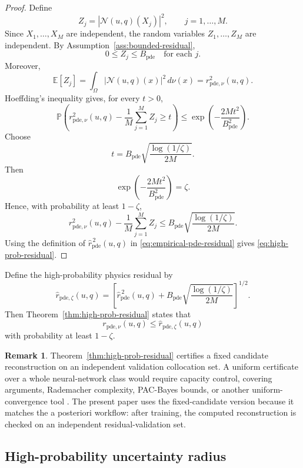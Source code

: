 \documentclass{article}
\numberwithin{equation}{section}
\theoremstyle{definition}
\newtheorem{remark}{Remark}
\begin{document}
\begin{proof}
Define
\[
Z_j
=
\left|
\mathcal N(u,q)(X_j)
\right|^2,
\qquad
j=1,\dots,M.
\]
Since \(X_1,\dots,X_M\) are independent, the random variables \(Z_1,\dots,Z_M\) are independent. By Assumption~\ref{ass:bounded-residual},
\[
0\le Z_j\le B_{\mathrm{pde}}
\quad
\text{for each }j.
\]
Moreover,
\[
\mathbb E[Z_j]
=
\int_{\Omega}
\left|
\mathcal N(u,q)(x)
\right|^2
\,d\nu(x)
=
r_{\mathrm{pde},\nu}^{2}(u,q).
\]
Hoeffding's inequality gives, for every \(t>0\),
\[
\mathbb P\left(
r_{\mathrm{pde},\nu}^{2}(u,q)
-
\frac{1}{M}\sum_{j=1}^{M}Z_j
\ge t
\right)
\le
\exp\left(
-\frac{2Mt^2}{B_{\mathrm{pde}}^2}
\right).
\]
Choose
\[
t
=
B_{\mathrm{pde}}
\sqrt{
\frac{\log(1/\zeta)}{2M}
}.
\]
Then
\[
\exp\left(
-\frac{2Mt^2}{B_{\mathrm{pde}}^2}
\right)
=
\zeta.
\]
Hence, with probability at least \(1-\zeta\),
\[
r_{\mathrm{pde},\nu}^{2}(u,q)
-
\frac{1}{M}\sum_{j=1}^{M}Z_j
\le
B_{\mathrm{pde}}
\sqrt{
\frac{\log(1/\zeta)}{2M}
}.
\]
Using the definition of \(\widehat r_{\mathrm{pde}}^{\,2}(u,q)\) in \eqref{eq:empirical-pde-residual} gives \eqref{eq:high-prob-residual}.
\end{proof}

Define the high-probability physics residual by
\begin{equation}
\widehat r_{\mathrm{pde},\zeta}(u,q)
=
\left[
\widehat r_{\mathrm{pde}}^{\,2}(u,q)
+
B_{\mathrm{pde}}
\sqrt{
\frac{\log(1/\zeta)}{2M}
}
\right]^{1/2}.
\label{eq:hp-pde-residual}
\end{equation}
Then Theorem~\ref{thm:high-prob-residual} states that
\begin{equation}
r_{\mathrm{pde},\nu}(u,q)
\le
\widehat r_{\mathrm{pde},\zeta}(u,q)
\label{eq:hp-pde-residual-bound}
\end{equation}
with probability at least \(1-\zeta\).

\begin{remark}
Theorem~\ref{thm:high-prob-residual} certifies a fixed candidate reconstruction on an independent validation collocation set. A uniform certificate over a whole neural-network class would require capacity control, covering arguments, Rademacher complexity, PAC-Bayes bounds, or another uniform-convergence tool \cite{Vapnik1998,ShalevShwartzBenDavid2014}. The present paper uses the fixed-candidate version because it matches the a posteriori workflow: after training, the computed reconstruction is checked on an independent residual-validation set.
\end{remark}

\subsection{High-probability uncertainty radius}
\end{document}
